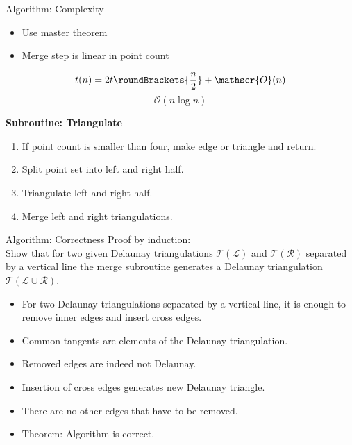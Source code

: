 \documentclass[aspectratio=169,fleqn]{beamer}
\begin{document}
  \begin{frame}{Algorithm: Complexity}
    \begin{minipage}[c]{0.49\textwidth}
      \begin{itemize}
        \item Use master theorem
        \item Merge step is linear in point count
      \end{itemize}
      \[
        t(n) = 2 t\roundBrackets{\frac{n}{2}} + \mathscr{O}(n)
      \]
      \[
        \mathscr{O}(n\log n)
      \]
    \end{minipage}
    \hfill
    \begin{minipage}[c]{0.49\textwidth}
      \begin{mybox}
        \textbf{Subroutine: Triangulate}
        \begin{enumerate}
          \item If point count is smaller than four, make edge or triangle and return.
          \item Split point set into left and right half.
          \item Triangulate left and right half.
          \item Merge left and right triangulations.
        \end{enumerate}
      \end{mybox}%
    \end{minipage}
  \end{frame}

  \begin{frame}{Algorithm: Correctness}
    Proof by induction: \\
    Show that for two given Delaunay triangulations $\mathscr{T}(\mathscr{L})$ and $\mathscr{T}(\mathscr{R})$ separated by a vertical line the merge subroutine generates a Delaunay triangulation $\mathscr{T}(\mathscr{L}\cup\mathscr{R})$.
    \begin{itemize}
      \item For two Delaunay triangulations separated by a vertical line, it is enough to remove inner edges and insert cross edges.
      \item Common tangents are elements of the Delaunay triangulation.
      \item Removed edges are indeed not Delaunay.
      \item Insertion of cross edges generates new Delaunay triangle.
      \item There are no other edges that have to be removed.
      \item Theorem: Algorithm is correct.
    \end{itemize}
  \end{frame}
\end{document}
